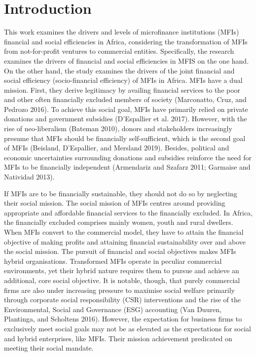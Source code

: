 \documentclass[
]{article}
\begin{document}
\hypertarget{introduction}{%
\section{Introduction}\label{introduction}}

This work examines the drivers and levels of microfinance institutions
(MFIs) financial and social efficiencies in Africa, considering the
transformation of MFIs from not-for-profit ventures to commercial
entities. Specifically, the research examines the drivers of financial
and social efficiencies in MFIS on the one hand. On the other hand, the
study examines the drivers of the joint financial and social efficiency
(socio-financial efficiency) of MFIs in Africa. MFIs have a dual
mission. First, they derive legitimacy by availing financial services to
the poor and other often financially excluded members of society
(Marconatto, Cruz, and Pedrozo 2016). To achieve this social goal, MFIs
have primarily relied on private donations and government subsidies
(D'Espallier et al. 2017). However, with the rise of neo-liberalism
(Bateman 2010), donors and stakeholders increasingly presume that MFIs
should be financially self-sufficient, which is the second goal of MFIs
(Beisland, D'Espallier, and Mersland 2019). Besides, political and
economic uncertainties surrounding donations and subsidies reinforce the
need for MFIs to be financially independent (Armendariz and Szafarz
2011; Garmaise and Natividad 2013).

If MFIs are to be financially sustainable, they should not do so by
neglecting their social mission. The social mission of MFIs centres
around providing appropriate and affordable financial services to the
financially excluded. In Africa, the financially excluded comprises
mainly women, youth and rural dwellers. When MFIs convert to the
commercial model, they have to attain the financial objective of making
profits and attaining financial sustainability over and above the social
mission. The pursuit of financial and social objectives makes MFIs
hybrid organisations. Transformed MFIs operate in peculiar commercial
environments, yet their hybrid nature requires them to pursue and
achieve an additional, core social objective. It is notable, though,
that purely commercial firms are also under increasing pressure to
maximise social welfare primarily through corporate social
responsibility (CSR) interventions and the rise of the Environmental,
Social and Governance (ESG) accounting (Van Duuren, Plantinga, and
Scholtens 2016). However, the expectation for business firms to
exclusively meet social goals may not be as elevated as the expectations
for social and hybrid enterprises, like MFIs. Their mission achievement
predicated on meeting their social mandate.
\end{document}
